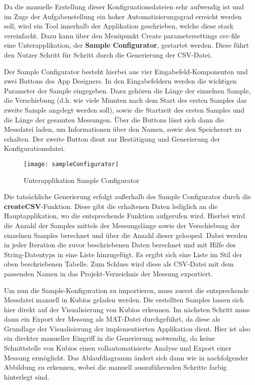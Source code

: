 Da die manuelle Erstellung dieser Konfigruationsdateien sehr aufwendig ist und im Zuge der Aufgabenstellung ein hoher Automatisierungsgrad erreicht werden soll, wird ein Tool innerhalb der Applikation geschrieben, welche diese stark vereinfacht. Dazu kann über den Menüpunkt \glqq Create parametersettings csv-file\grqq{} eine Unterapplikation, der \textbf{Sample Configurator}, gestartet werden. Diese führt den Nutzer Schritt für Schritt durch die Generierung der CSV-Datei.   

Der Sample Configurator besteht hierbei aus vier Eingabefeld-Komponenten und zwei Buttons des App Designers. In den Eingabefeldern werden die wichtigen Parameter der Sample eingegeben. Dazu gehören die Länge der einzelnen Sample, die Verschiebung (d.h. wie viele Minuten nach dem Start des ersten Samples das zweite Sample angelegt werden soll), sowie die Startzeit des ersten Samples und die Länge der gesamten Messungen. Über die Buttons lässt sich dann die Messdatei laden, um Informationen über den Namen, sowie den Speicherort zu erhalten. Der zweite Button dient zur Bestätigung und Generierung der Konfigurationsdatei.

\begin{figure}[H]
	\centering
	\texttt{[image: sampleConfigurator]}
	\caption{Unterapplikation Sample Configurator}
	\label{fig:sampleConfigurator}
\end{figure}

Die tatsächliche Generierung erfolgt außerhalb des Sample Configurator durch die \textbf{createCSV}-Funktion. Diese gibt die erhaltenen Daten lediglich an die Hauptapplikation, wo die entsprechende Funktion aufgerufen wird. Hierbei wird die Anzahl der Samples mittels der Messungslänge sowie der Verschiebung der einzelnen Samples berechnet und über die Anzahl dieser gelooped. Dabei werden in jeder Iteration die zuvor beschriebenen Daten berechnet und mit Hilfe des String-Datentyps in eine Liste hinzugefügt. Es ergibt sich eine Liste im Stil der oben beschriebenen Tabelle. Zum Schluss wird diese als CSV-Datei mit dem passenden Namen in das Projekt-Verzeichnis der Messung exportiert.



Um nun die Sample-Konfiguration zu importieren, muss zuerst die entsprechende Messdatei manuell in Kubios geladen werden. Die erstellten Samples lassen sich hier direkt auf der Visualisierung von Kubios erkennen. Im nächsten Schritt muss dann ein Export der Messung als MAT-Datei durchgeführt, da diese als Grundlage der Visualisierung der implementierten Applikation dient. Hier ist also ein direkter manueller Eingriff in die Generierung notwendig, da keine Schnittstelle von Kubios einen vollautomatisierte Analyse und Export einer Messung ermöglicht. Das Ablaufdiagramm ändert sich dann wie in nachfolgender Abbildung zu erkennen, wobei die manuell auszuführenden Schritte farbig hinterlegt sind.

